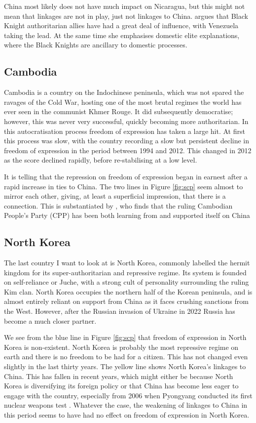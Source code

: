 China most likely does not have much impact on Nicaragua, but this might not mean that linkages are not in play, just not linkages to China. \citet[p. 198]{mcconnell_elite_2024} argues that Black Knight authoritarian allies have had a great deal of influence, with Venezuela taking the lead. At the same time she emphasises domestic elite explanations, where the Black Knights are ancillary to domestic processes.

\subsection{Cambodia}
Cambodia is a country on the Indochinese peninsula, which was not spared the ravages of the Cold War, hosting one of the most brutal regimes the world has ever seen in the communist Khmer Rouge. It did subsequently democratise; however, this was never very successful, quickly becoming more authoritarian. In this autocratisation process freedom of expression has taken a large hit. At first this process was slow, with the country recording a slow but persistent decline in freedom of expression in the period between 1994 and 2012. This changed in 2012 as the score declined rapidly, before re-stabilising at a low level.

It is telling that the repression on freedom of expression began in earnest after a rapid increase in ties to China. The two lines in Figure \ref{fig:scp} seem almost to mirror each other, giving, at least a superficial impression, that there is a connection. This is substantiated by \citet{loughlin_chinese_2021}, who finds that the ruling Cambodian People's Party (CPP) has been both learning from and supported itself on China

\subsection{North Korea}
The last country I want to look at is North Korea, commonly labelled the hermit kingdom for its super-authoritarian and repressive regime. Its system is founded on self-reliance or Juche, with a strong cult of personality surrounding the ruling Kim clan. North Korea occupies the northern half of the Korean peninsula, and is almost entirely reliant on support from China as it faces crushing sanctions from the West. However, after the Russian invasion of Ukraine in 2022 Russia has become a much closer partner.

We see from the blue line in Figure \ref{fig:scp} that freedom of expression in North Korea is non-existent. North Korea is probably the most repressive regime on earth and there is no freedom to be had for a citizen. This has not changed even slightly in the last thirty years. The yellow line shows North Korea's linkages to China. This has fallen in recent years, which might either be because North Korea is diversifying its foreign policy or that China has become less eager to engage with the country, especially from 2006 when Pyongyang conducted its first nuclear weapons test \citep{fong_understanding_2024}. Whatever the case, the weakening of linkages to China in this period seems to have had no effect on freedom of expression in North Korea.

